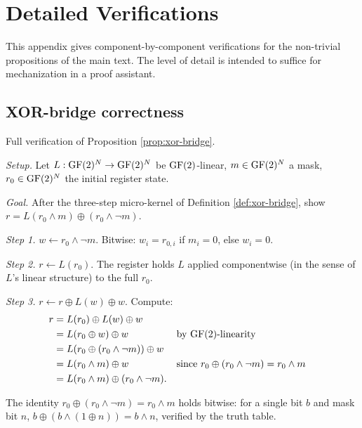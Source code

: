 \section{Detailed Verifications}\label{app:b}

This appendix gives component-by-component
verifications for the non-trivial propositions of
the main text. The level of detail is intended to
suffice for mechanization in a proof assistant.

\subsection{XOR-bridge correctness}\label{app:b-xor-bridge}

Full verification of Proposition \ref{prop:xor-bridge}.

\emph{Setup.} Let $L : \operatorname{GF}(2)^N \to \operatorname{GF}(2)^N$ be
$\operatorname{GF}(2)$-linear, $m \in \operatorname{GF}(2)^N$ a mask, $r_0
\in \operatorname{GF}(2)^N$ the initial register state.

\emph{Goal.} After the three-step micro-kernel of
Definition \ref{def:xor-bridge}, show
$r = L(r_0 \wedge m) \oplus (r_0 \wedge \neg m)$.

\emph{Step 1.} $w \leftarrow r_0 \wedge \neg m$.
Bitwise: $w_i = r_{0,i}$ if $m_i = 0$, else $w_i = 0$.

\emph{Step 2.} $r \leftarrow L(r_0)$. The register
holds $L$ applied componentwise (in the sense of $L$'s
linear structure) to the full $r_0$.

\emph{Step 3.} $r \leftarrow r \oplus L(w) \oplus w$.
Compute:
\begin{align*}
  r &= L(r_0) \oplus L(w) \oplus w \\
    &= L(r_0 \oplus w) \oplus w
      &&\text{by $\operatorname{GF}(2)$-linearity}\\
    &= L(r_0 \oplus (r_0 \wedge \neg m)) \oplus w \\
    &= L(r_0 \wedge m) \oplus w
      &&\text{since $r_0 \oplus (r_0 \wedge \neg m)
      = r_0 \wedge m$} \\
    &= L(r_0 \wedge m) \oplus (r_0 \wedge \neg m).
\end{align*}

The identity $r_0 \oplus (r_0 \wedge \neg m) = r_0
\wedge m$ holds bitwise: for a single bit $b$ and
mask bit $n$, $b \oplus (b \wedge (1 \oplus n)) =
b \wedge n$, verified by the truth table.

